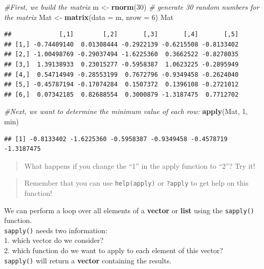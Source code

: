 \documentclass[
]{book}
\newenvironment{Shaded}{\begin{snugshade}}{\end{snugshade}}
\newcommand{\AttributeTok}[1]{\textcolor[rgb]{0.13,0.29,0.53}{#1}}
\newcommand{\CommentTok}[1]{\textcolor[rgb]{0.56,0.35,0.01}{\textit{#1}}}
\newcommand{\DecValTok}[1]{\textcolor[rgb]{0.00,0.00,0.81}{#1}}
\newcommand{\FunctionTok}[1]{\textcolor[rgb]{0.13,0.29,0.53}{\textbf{#1}}}
\newcommand{\NormalTok}[1]{#1}
\newcommand{\OtherTok}[1]{\textcolor[rgb]{0.56,0.35,0.01}{#1}}
\begin{document}
\begin{Shaded}
\begin{Highlighting}[]
\CommentTok{\#First, we build the matrix }
\NormalTok{m }\OtherTok{\textless{}{-}} \FunctionTok{rnorm}\NormalTok{(}\DecValTok{30}\NormalTok{)   }\CommentTok{\# generate 30 random numbers for the matrix}
\NormalTok{Mat }\OtherTok{\textless{}{-}} \FunctionTok{matrix}\NormalTok{(}\AttributeTok{data =}\NormalTok{ m, }\AttributeTok{nrow =} \DecValTok{6}\NormalTok{)}
\NormalTok{Mat}
\end{Highlighting}
\end{Shaded}

\begin{verbatim}
##             [,1]        [,2]       [,3]       [,4]       [,5]
## [1,] -0.74409140  0.01308444 -0.2922139 -0.6215508 -0.8133402
## [2,] -1.00498769 -0.29037494 -1.6225360  0.3662522 -0.8278035
## [3,]  1.39138933  0.23015277 -0.5958387  1.0623225 -0.2895949
## [4,]  0.54714949 -0.28553199  0.7672796 -0.9349458 -0.2624040
## [5,] -0.45787194 -0.17074284  0.1507372  0.1396108 -0.2721012
## [6,]  0.07342185  0.82688554  0.3000879 -1.3187475  0.7712702
\end{verbatim}

\begin{Shaded}
\begin{Highlighting}[]
\CommentTok{\#Next, we want to determine the minimum value of each row: }
\FunctionTok{apply}\NormalTok{(Mat, }\DecValTok{1}\NormalTok{, min)}
\end{Highlighting}
\end{Shaded}

\begin{verbatim}
## [1] -0.8133402 -1.6225360 -0.5958387 -0.9349458 -0.4578719 -1.3187475
\end{verbatim}

\begin{quote}
What happens if you change the ``1'' in the apply function to ``2''?
Try it!
\end{quote}

\begin{quote}
Remember that you can use \texttt{help(apply)} or \texttt{?apply} to get help on this function!
\end{quote}

We can perform a loop over all elements of a \textbf{vector} or \textbf{list} using the \texttt{sapply()} function.\\
\texttt{sapply()} needs two information:\\
1.
which vector do we consider?\\
2.
which function do we want to apply to each element of this vector?\\
\texttt{sapply()} will return a \textbf{vector} containing the results.
\end{document}
